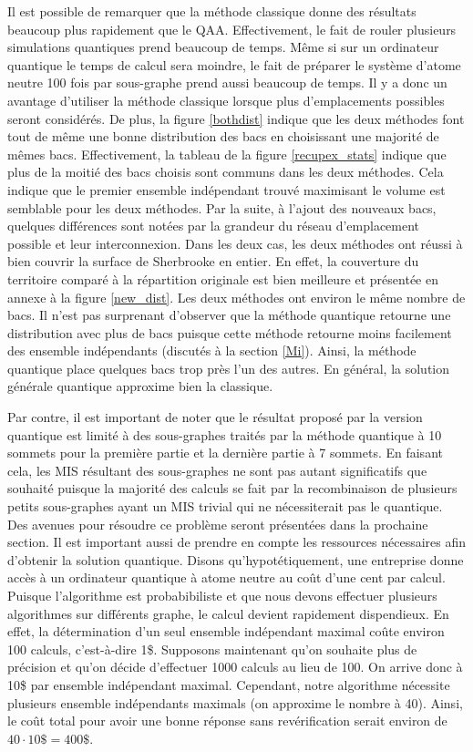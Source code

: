 \documentclass[11pt]{article}
\begin{document}
Il est possible de remarquer que la méthode classique donne des résultats beaucoup plus rapidement que le QAA. Effectivement, le fait de rouler plusieurs simulations quantiques prend beaucoup de temps. Même si sur un ordinateur quantique le temps de calcul sera moindre, le fait de préparer le système d'atome neutre 100 fois par sous-graphe prend aussi beaucoup de temps. Il y a donc un avantage d'utiliser la méthode classique lorsque plus d'emplacements possibles seront considérés. De plus, la figure \ref{bothdist} indique que les deux méthodes font tout de même une bonne distribution des bacs en choisissant une majorité de mêmes bacs. Effectivement, la tableau de la figure \ref{recupex_stats} indique que plus de la moitié des  bacs choisis sont communs dans les deux méthodes. Cela indique que le premier ensemble indépendant trouvé maximisant le volume est semblable pour les deux méthodes.  Par la suite, à l'ajout des nouveaux bacs, quelques différences sont notées par la grandeur du réseau d'emplacement possible et leur interconnexion. Dans les deux cas, les deux méthodes ont réussi à bien couvrir la surface de Sherbrooke en entier. En effet, la couverture du territoire comparé à la répartition originale est bien meilleure et présentée en annexe à la figure \ref{new_dist}. Les deux méthodes ont environ le même nombre de bacs. Il n'est pas surprenant d'observer que la méthode quantique retourne une distribution avec plus de bacs puisque cette méthode retourne moins facilement des ensemble indépendants (discutés à la section \ref{Mi}). Ainsi, la méthode quantique place quelques bacs trop près l'un des autres. En général, la solution générale quantique approxime bien la classique.



Par contre, il est important de noter que le résultat proposé par la version quantique est limité à des sous-graphes traités par la méthode quantique à 10 sommets pour la première partie et la dernière partie à 7 sommets. En faisant cela, les MIS résultant des sous-graphes ne sont pas autant significatifs que souhaité puisque la majorité des calculs se fait par la recombinaison de plusieurs petits sous-graphes ayant un MIS trivial qui ne nécessiterait pas le quantique. Des avenues pour résoudre ce problème seront présentées dans la prochaine section. Il est important aussi de prendre en compte les ressources nécessaires afin d'obtenir la solution quantique. Disons qu'hypotétiquement, une entreprise donne accès à un ordinateur quantique à atome neutre au coût d'une cent par calcul. Puisque l'algorithme est probabibiliste et que nous devons effectuer plusieurs algorithmes sur différents graphe, le calcul devient rapidement dispendieux. En effet, la détermination d'un seul ensemble indépendant maximal coûte environ 100 calculs, c'est-à-dire 1\$. Supposons maintenant qu'on souhaite plus de précision et qu'on décide d'effectuer 1000 calculs au lieu de 100. On arrive donc à 10\$ par ensemble indépendant maximal. Cependant, notre algorithme nécessite plusieurs ensemble indépendants maximals (on approxime le nombre à 40). Ainsi, le coût total pour avoir une bonne réponse sans revérification serait environ de $40\cdot10\$ = 400\$$. 
\end{document}
